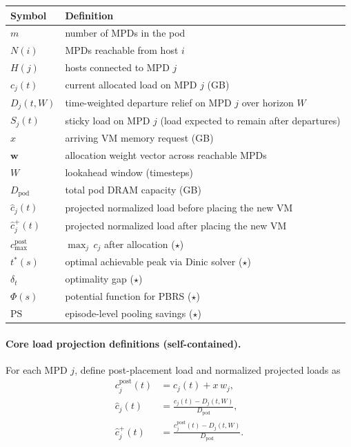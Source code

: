 \documentclass[11pt]{article}
\begin{document}
\begin{center}
\small
\renewcommand{\arraystretch}{1.2}
\begin{tabular}{ll}
\toprule
\textbf{Symbol} & \textbf{Definition} \\
\midrule
$m$                  & number of MPDs in the pod \\
$N(i)$               & MPDs reachable from host $i$ \\
$H(j)$               & hosts connected to MPD $j$ \\
$c_j(t)$             & current allocated load on MPD $j$ (GB) \\
$D_j(t,W)$           & time-weighted departure relief on MPD $j$ over horizon $W$ \\
$S_j(t)$             & sticky load on MPD $j$ (load expected to remain after departures) \\
$x$                  & arriving VM memory request (GB) \\
$\mathbf{w}$         & allocation weight vector across reachable MPDs \\
$W$                  & lookahead window (timesteps) \\
$D_{\text{pod}}$     & total pod DRAM capacity (GB) \\
$\hat{c}_j(t)$       & projected normalized load before placing the new VM \\
$\hat{c}_j^+(t)$     & projected normalized load after placing the new VM \\
\midrule
$c_{\max}^{\text{post}}$ & $\max_j\, c_j$ after allocation ($\star$) \\
$t^*(s)$             & optimal achievable peak via Dinic solver ($\star$) \\
$\delta_t$           & optimality gap ($\star$) \\
$\Phi(s)$            & potential function for PBRS ($\star$) \\
$\mathrm{PS}$        & episode-level pooling savings ($\star$) \\
\bottomrule
\end{tabular}
\end{center}

\paragraph{Core load projection definitions (self-contained).}
For each MPD $j$, define post-placement load and normalized projected loads as
\begin{align}
  c_j^{\text{post}}(t) &= c_j(t) + x\,w_j, \\
  \hat{c}_j(t) &= \frac{c_j(t) - D_j(t,W)}{D_{\text{pod}}}, \\
  \hat{c}_j^+(t) &= \frac{c_j^{\text{post}}(t) - D_j(t,W)}{D_{\text{pod}}}.
\end{align}
\end{document}

